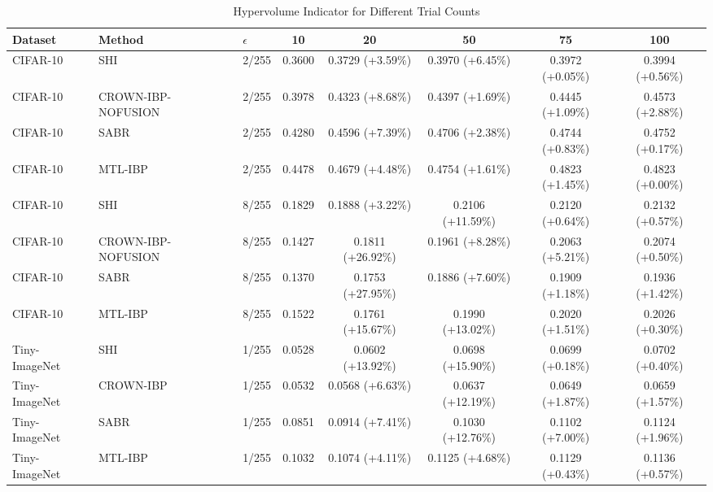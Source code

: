 \begin{table}[htbp]
\centering
\caption{Hypervolume Indicator for Different Trial Counts}
\label{tab:combined_hypervolume}
\begin{tabular}{lll|ccccc}
\toprule
Dataset & Method & $\epsilon$ & 10 & 20 & 50 & 75 & 100 \\
\midrule
CIFAR-10 & SHI & 2/255 & 0.3600 & 0.3729 (+3.59\%) & 0.3970 (+6.45\%) & 0.3972 (+0.05\%) & 0.3994 (+0.56\%) \\
CIFAR-10 & CROWN-IBP-NOFUSION & 2/255 & 0.3978 & 0.4323 (+8.68\%) & 0.4397 (+1.69\%) & 0.4445 (+1.09\%) & 0.4573 (+2.88\%) \\
CIFAR-10 & SABR & 2/255 & 0.4280 & 0.4596 (+7.39\%) & 0.4706 (+2.38\%) & 0.4744 (+0.83\%) & 0.4752 (+0.17\%) \\
CIFAR-10 & MTL-IBP & 2/255 & 0.4478 & 0.4679 (+4.48\%) & 0.4754 (+1.61\%) & 0.4823 (+1.45\%) & 0.4823 (+0.00\%) \\
CIFAR-10 & SHI & 8/255 & 0.1829 & 0.1888 (+3.22\%) & 0.2106 (+11.59\%) & 0.2120 (+0.64\%) & 0.2132 (+0.57\%) \\
CIFAR-10 & CROWN-IBP-NOFUSION & 8/255 & 0.1427 & 0.1811 (+26.92\%) & 0.1961 (+8.28\%) & 0.2063 (+5.21\%) & 0.2074 (+0.50\%) \\
CIFAR-10 & SABR & 8/255 & 0.1370 & 0.1753 (+27.95\%) & 0.1886 (+7.60\%) & 0.1909 (+1.18\%) & 0.1936 (+1.42\%) \\
CIFAR-10 & MTL-IBP & 8/255 & 0.1522 & 0.1761 (+15.67\%) & 0.1990 (+13.02\%) & 0.2020 (+1.51\%) & 0.2026 (+0.30\%) \\
Tiny-ImageNet & SHI & 1/255 & 0.0528 & 0.0602 (+13.92\%) & 0.0698 (+15.90\%) & 0.0699 (+0.18\%) & 0.0702 (+0.40\%) \\
Tiny-ImageNet & CROWN-IBP & 1/255 & 0.0532 & 0.0568 (+6.63\%) & 0.0637 (+12.19\%) & 0.0649 (+1.87\%) & 0.0659 (+1.57\%) \\
Tiny-ImageNet & SABR & 1/255 & 0.0851 & 0.0914 (+7.41\%) & 0.1030 (+12.76\%) & 0.1102 (+7.00\%) & 0.1124 (+1.96\%) \\
Tiny-ImageNet & MTL-IBP & 1/255 & 0.1032 & 0.1074 (+4.11\%) & 0.1125 (+4.68\%) & 0.1129 (+0.43\%) & 0.1136 (+0.57\%) \\
\bottomrule
\end{tabular}
\end{table}
